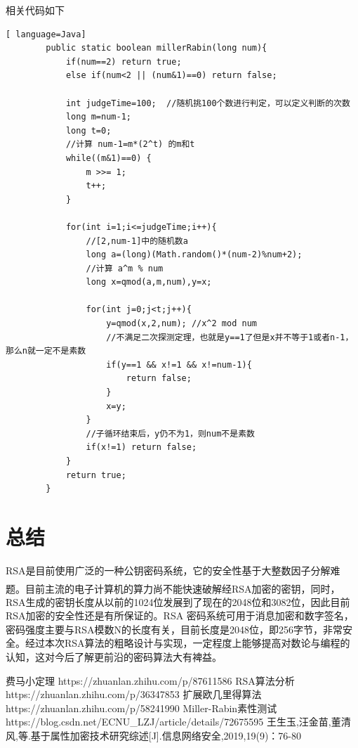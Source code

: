 \documentclass[UTF8,a4paper,11pt]{ctexart}
\newcommand{\upcite}[1]{\textsuperscript{\textsuperscript{\cite{#1}}}}
\begin{document}
	\par 相关代码如下
	\begin{lstlisting}[ language=Java]
		public static boolean millerRabin(long num){
    		if(num==2) return true;
    		else if(num<2 || (num&1)==0) return false;

    		int judgeTime=100;  //随机挑100个数进行判定，可以定义判断的次数
		    long m=num-1;
		    long t=0;
		    //计算 num-1=m*(2^t) 的m和t
		    while((m&1)==0) {
		        m >>= 1;
		        t++;
		    }

		    for(int i=1;i<=judgeTime;i++){
		        //[2,num-1]中的随机数a
		        long a=(long)(Math.random()*(num-2)%num+2);
		        //计算 a^m % num
		        long x=qmod(a,m,num),y=x;
		
		        for(int j=0;j<t;j++){
		            y=qmod(x,2,num); //x^2 mod num
		            //不满足二次探测定理，也就是y==1了但是x并不等于1或者n-1，那么n就一定不是素数
		            if(y==1 && x!=1 && x!=num-1){
		                return false;
		            }
		            x=y;
		        }
		        //子循环结束后，y仍不为1，则num不是素数
		        if(x!=1) return false;
		    }
		    return true;
		}
	\end{lstlisting}


\section{总结}
	\par RSA是目前使用广泛的一种公钥密码系统，它的安全性基于大整数因子分解难题\upcite{5}。目前主流的电子计算机的算力尚不能快速破解经RSA加密的密钥，同时，RSA生成的密钥长度从以前的1024位发展到了现在的2048位和3082位，因此目前RSA加密的安全性还是有所保证的。RSA 密码系统可用于消息加密和数字签名，密码强度主要与RSA模数N的长度有关，目前长度是2048位，即256字节，非常安全。经过本次RSA算法的粗略设计与实现，一定程度上能够提高对数论与编程的认知，这对今后了解更前沿的密码算法大有裨益。

\begin{thebibliography}{5}
	费马小定理 https://zhuanlan.zhihu.com/p/87611586
	RSA算法分析 https://zhuanlan.zhihu.com/p/36347853
	扩展欧几里得算法 https://zhuanlan.zhihu.com/p/58241990
	Miller-Rabin素性测试 https://blog.csdn.net/ECNU\_LZJ/article/details/72675595
	王生玉,汪金苗,董清风,等.基于属性加密技术研究综述[J].信息网络安全,2019,19(9)：76-80
\end{thebibliography}

 
\end{document}
